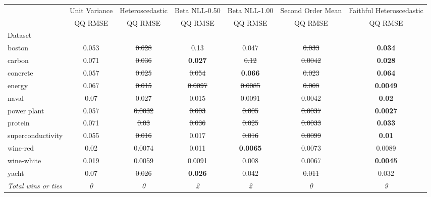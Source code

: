 \begin{tabular}{l|c|c|c|c|c|c}
\toprule
{} & {Unit Variance} & {Heteroscedastic} & {Beta NLL-0.50} & {Beta NLL-1.00} & {Second Order Mean} & {Faithful Heteroscedastic} \\
{} & {QQ RMSE} & {QQ RMSE} & {QQ RMSE} & {QQ RMSE} & {QQ RMSE} & {QQ RMSE} \\
{Dataset} & {} & {} & {} & {} & {} & {} \\
\midrule
boston & 0.053 & \sout{0.028} & 0.13 & 0.047 & \sout{0.033} & \textbf{0.034} \\
carbon & 0.071 & \sout{0.036} & \textbf{0.027} & \sout{0.12} & \sout{0.0042} & \textbf{0.028} \\
concrete & 0.057 & \sout{0.025} & \sout{0.054} & \textbf{0.066} & \sout{0.023} & \textbf{0.064} \\
energy & 0.067 & \sout{0.015} & \sout{0.0097} & \sout{0.0085} & \sout{0.008} & \textbf{0.0049} \\
naval & 0.07 & \sout{0.027} & \sout{0.015} & \sout{0.0091} & \sout{0.0042} & \textbf{0.02} \\
power plant & 0.057 & \sout{0.0032} & \sout{0.003} & \sout{0.005} & \sout{0.0037} & \textbf{0.0027} \\
protein & 0.071 & \sout{0.03} & \sout{0.036} & \sout{0.025} & \sout{0.0033} & \textbf{0.033} \\
superconductivity & 0.055 & \sout{0.016} & 0.017 & \sout{0.016} & \sout{0.0099} & \textbf{0.01} \\
wine-red & 0.02 & 0.0074 & 0.011 & \textbf{0.0065} & 0.0073 & 0.0089 \\
wine-white & 0.019 & 0.0059 & 0.0091 & 0.008 & 0.0067 & \textbf{0.0045} \\
yacht & 0.07 & \sout{0.026} & \textbf{0.026} & 0.042 & \sout{0.011} & 0.032 \\
\textit{{Total wins or ties}} & \textit{0} & \textit{0} & \textit{2} & \textit{2} & \textit{0} & \textit{9} \\
\bottomrule
\end{tabular}

